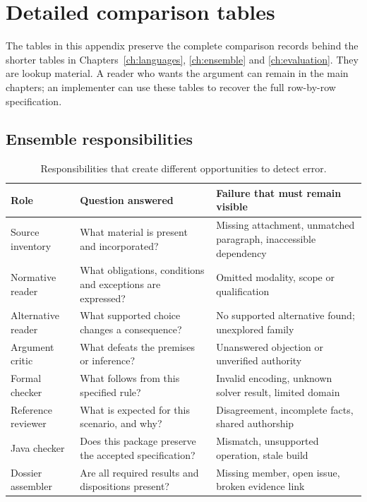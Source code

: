 \chapter{Detailed comparison tables}
\label{app:detailed-tables}

The tables in this appendix preserve the complete comparison records behind the
shorter tables in Chapters~\ref{ch:languages}, \ref{ch:ensemble} and
\ref{ch:evaluation}. They are lookup material. A reader who wants the argument
can remain in the main chapters; an implementer can use these tables to recover
the full row-by-row specification.

\section{Ensemble responsibilities}
\begin{table}[htbp]
\centering\small
\caption{Responsibilities that create different opportunities to detect error.}
\label{tab:ensemble-roles-detail}
\begin{tabularx}{\textwidth}{P{31mm}YY}
\toprule
Role & Question answered & Failure that must remain visible\\
\midrule
Source inventory & What material is present and incorporated? & Missing attachment, unmatched paragraph, inaccessible dependency\\
Normative reader & What obligations, conditions and exceptions are expressed? & Omitted modality, scope or qualification\\
Alternative reader & What supported choice changes a consequence? & No supported alternative found; unexplored family\\
Argument critic & What defeats the premises or inference? & Unanswered objection or unverified authority\\
Formal checker & What follows from this specified rule? & Invalid encoding, unknown solver result, limited domain\\
Reference reviewer & What is expected for this scenario, and why? & Disagreement, incomplete facts, shared authorship\\
Java checker & Does this package preserve the accepted specification? & Mismatch, unsupported operation, stale build\\
Dossier assembler & Are all required results and dispositions present? & Missing member, open issue, broken evidence link\\
\bottomrule
\end{tabularx}
\end{table}

